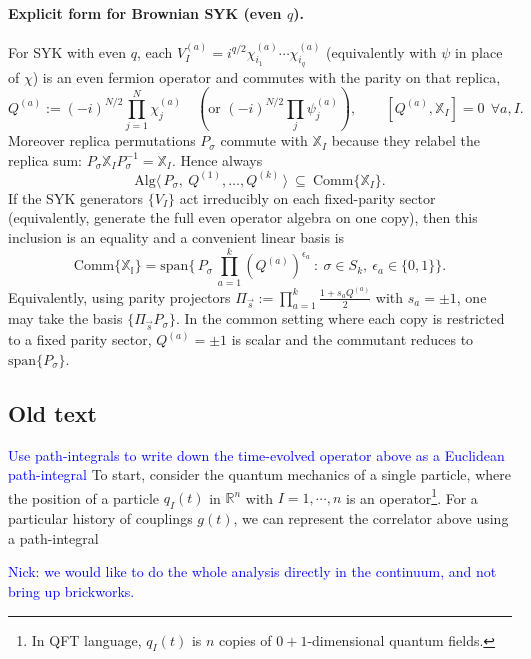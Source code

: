\documentclass{article}
\theoremstyle{definition}
\newcommand{\NL}[1]{\textcolor{blue}{#1}}
\begin{document}
    \paragraph{Explicit form for Brownian SYK (even $q$).}
    For SYK with even $q$, each
    $V_{I}^{(a)}=i^{q/2}\chi^{(a)}_{i_1}\cdots\chi^{(a)}_{i_q}$ (equivalently with
    $\psi$ in place of $\chi$) is an even fermion operator and commutes with the
    parity on that replica,
    \[
        Q^{(a)}:=(-i)^{N/2}\prod_{j=1}^{N}\chi^{(a)}_{j}\quad (\text{or }(-i)^{N/2}
        \prod_{j}\psi^{(a)}_{j}),\qquad [Q^{(a)},\mathbb{X}_{I}]=0\ \ \forall a,
        I.
    \]
    Moreover replica permutations $P_{\sigma}$ commute with $\mathbb{X}_{I}$ because
    they relabel the replica sum:
    $P_{\sigma}\mathbb{X}_{I}P_{\sigma}^{-1}=\mathbb{X}_{I}$. Hence always
    \[
        \mathrm{Alg}\langle\,P_{\sigma},\ Q^{(1)},\dots,Q^{(k)}\,\rangle\ \subseteq
        \ \mathrm{Comm}\{\mathbb{X}_{I}\}.
    \]
    If the SYK generators $\{V_{I}\}$ act irreducibly on each fixed-parity sector
    (equivalently, generate the full even operator algebra on one copy), then this
    inclusion is an equality and a convenient linear basis is
    \[
        \boxed{\quad \mathrm{Comm}\{\mathbb{X_I}\} =\mathrm{span}\Big\{\,P_\sigma\,\prod_{a=1}^k (Q^{(a)})^{\epsilon_a}\ :\ \sigma\in S_k,\ \epsilon_a\in\{0,1\}\Big\}. \quad}
    \]
    Equivalently, using parity projectors
    $\Pi_{\vec s}:=\prod_{a=1}^{k}\frac{1+s_{a}Q^{(a)}}{2}$ with $s_{a}=\pm1$, one
    may take the basis $\{\Pi_{\vec s}P_{\sigma}\}$. In the common setting where
    each copy is restricted to a fixed parity sector, $Q^{(a)}=\pm1$ is scalar and
    the commutant reduces to $\mathrm{span}\{P_{\sigma}\}$.

    \subsection{Old text}

    \NL{Use path-integrals to write down the time-evolved operator above as a Euclidean path-integral}
    To start, consider the quantum mechanics of a single particle, where the position
    of a particle $q_{I}(t)$ in $\mathbb{R}^{n}$ with $I=1,\cdots, n$ is an operator\footnote{In
    QFT language, $q_{I}(t)$ is $n$ copies of $0+1$-dimensional quantum fields.}.
    For a particular history of couplings $g(t)$, we can represent the
    correlator above using a path-integral

    \NL{Nick: we would like to do the whole analysis directly in the continuum, and not bring up brickworks.}
\end{document}
